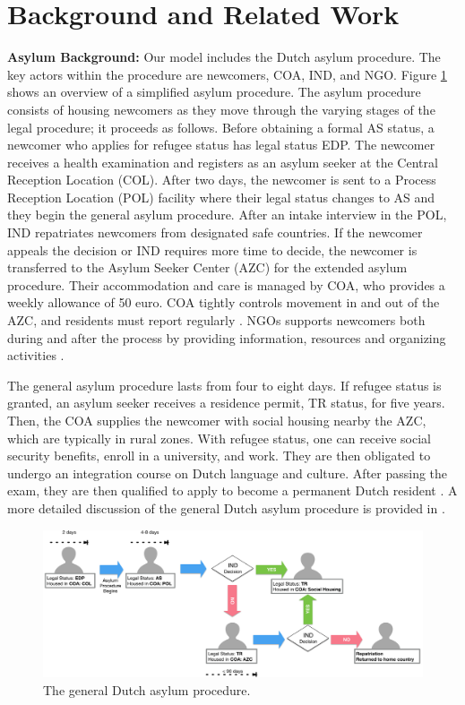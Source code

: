 \documentclass{scspaperproc}
\theoremstyle{scsthe}
\begin{document}
\section{Background and Related Work}
\label{sec:value-background}
{\bf Asylum Background:} Our model includes the Dutch asylum procedure. The key actors within the procedure are newcomers, COA, IND, and NGO. Figure \ref{fig:asy-proc} shows an overview of a simplified asylum procedure. The asylum procedure consists of housing newcomers as they move through the varying stages of the legal procedure; it proceeds as follows. Before obtaining a formal AS status, a newcomer who applies for refugee status has legal status EDP. The newcomer receives a health examination and registers as an asylum seeker at the Central Reception Location (COL). After two days, the newcomer is sent to a Process Reception Location (POL) facility where their legal status changes to AS and they begin the general asylum procedure. After an intake interview in the POL, IND repatriates newcomers from designated safe countries. If the newcomer appeals the decision or IND requires more time to decide, the newcomer is transferred to the Asylum Seeker Center (AZC) for the extended asylum procedure. Their accommodation and care is managed by COA, who provides a weekly allowance of 50 euro. COA tightly controls movement in and out of the AZC, and residents must report regularly \cite{9}. NGOs supports newcomers both during and after the process by providing information, resources and organizing activities \cite{94}.

The general asylum procedure lasts from four to eight days. If refugee status is granted, an asylum seeker receives a residence permit, TR status, for five years. Then, the COA supplies the newcomer with social housing nearby the AZC, which are typically in rural zones. With refugee status, one can receive social security benefits, enroll in a university, and work. They are then obligated to undergo an integration course on Dutch language and culture. After passing the exam, they are then qualified to apply to become a permanent Dutch resident \cite{9}. A more detailed discussion of the general Dutch asylum procedure is provided in \cite{phil.masters.thesis}.

\begin{figure}[htb]
{
\centering
\includegraphics[width=0.75\columnwidth]{Asylum-Procedure.png}
\caption{The general Dutch asylum procedure.}
\label{fig:asy-proc}
}
\end{figure}
\end{document}
